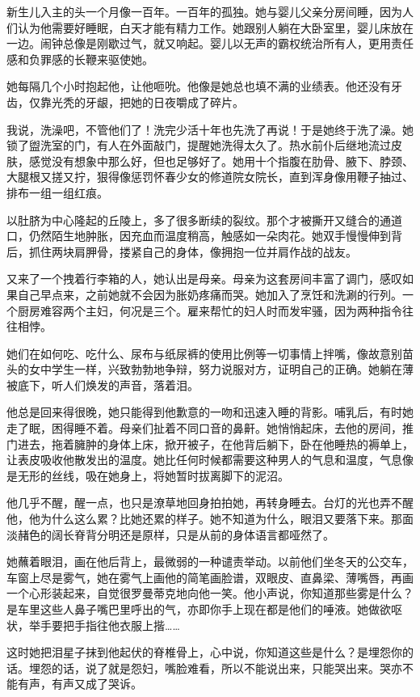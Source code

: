 \documentclass[lang=cn,newtx,12pt,scheme=chinese]{elegantbook}
\begin{document}
新生儿入主的头一个月像一百年。一百年的孤独。她与婴儿父亲分房间睡，因为人们认为他需要好睡眠，白天才能有精力工作。她跟别人躺在大卧室里，婴儿床放在一边。闹钟总像是刚歇过气，就又响起。婴儿以无声的霸权统治所有人，更用责任感和负罪感的长鞭来驱使她。

她每隔几个小时抱起他，让他咂吮。他像是她总也填不满的业绩表。他还没有牙齿，仅靠光秃的牙龈，把她的日夜嚼成了碎片。

我说，洗澡吧，不管他们了！洗完少活十年也先洗了再说！于是她终于洗了澡。她锁了盥洗室的门，有人在外面敲门，提醒她洗得太久了。热水前仆后继地流过皮肤，感觉没有想象中那么好，但也足够好了。她用十个指腹在肋骨、腋下、脖颈、大腿根又搓又拧，狠得像惩罚怀春少女的修道院女院长，直到浑身像用鞭子抽过、排布一组一组红痕。

以肚脐为中心隆起的丘陵上，多了很多断续的裂纹。那个才被撕开又缝合的通道口，仍然陌生地肿胀，因充血而温度稍高，触感如一朵肉花。她双手慢慢伸到背后，抓住两块肩胛骨，搂紧自己的身体，像拥抱一位并肩作战的战友。

又来了一个拽着行李箱的人，她认出是母亲。母亲为这套房间丰富了调门，感叹如果自己早点来，之前她就不会因为胀奶疼痛而哭。她加入了烹饪和洗涮的行列。一个厨房难容两个主妇，何况是三个。雇来帮忙的妇人时而发牢骚，因为两种指令往往相悖。

她们在如何吃、吃什么、尿布与纸尿裤的使用比例等一切事情上拌嘴，像故意别苗头的女中学生一样，兴致勃勃地争辩，努力说服对方，证明自己的正确。她躺在薄被底下，听人们焕发的声音，落着泪。

他总是回来得很晚，她只能得到他歉意的一吻和迅速入睡的背影。哺乳后，有时她走了眠，困得睡不着。母亲们扯着不同口音的鼻鼾。她悄悄起床，去他的房间，推门进去，拖着臃肿的身体上床，掀开被子，在他背后躺下，卧在他睡热的褥单上，让表皮吸收他散发出的温度。她比任何时候都需要这种男人的气息和温度，气息像是无形的丝线，吸在她身上，将她暂时拔离脚下的泥沼。

他几乎不醒，醒一点，也只是潦草地回身拍拍她，再转身睡去。台灯的光也弄不醒他，他为什么这么累？比她还累的样子。她不知道为什么，眼泪又要落下来。那面淡赭色的阔长脊背分明还是原样，只是从前的身体语言都哑然了。

她蘸着眼泪，画在他后背上，最微弱的一种谴责举动。以前他们坐冬天的公交车，车窗上尽是雾气，她在雾气上画他的简笔画脸谱，双眼皮、直鼻梁、薄嘴唇，再画一个心形装起来，自觉很罗曼蒂克地向他一笑。他小声说，你知道那些雾是什么？是车里这些人鼻子嘴巴里呼出的气，亦即你手上现在都是他们的唾液。她做欲呕状，举手要把手指往他衣服上揩……

这时她把泪星子抹到他起伏的脊椎骨上，心中说，你知道这些是什么？是埋怨你的话。埋怨的话，说了就是怨妇，嘴脸难看，所以不能说出来，只能哭出来。哭亦不能有声，有声又成了哭诉。
\end{document}
